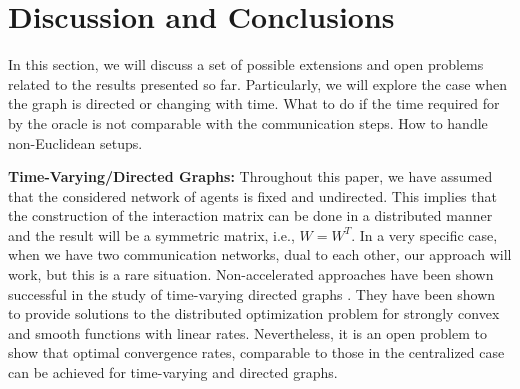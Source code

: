 \documentclass[final]{siamart1116}
\numberwithin{theorem}{section}
\begin{document}
	
	\section{Discussion and Conclusions}\label{sec:discussion}
	
	In this section, we will discuss a set of possible extensions and open problems related to the results presented so far. Particularly, we will explore the case when the graph is directed or changing with time. What to do if the time required for by the oracle is not comparable with the communication steps. How to handle non-Euclidean setups. 
	
	\noindent\textbf{Time-Varying/Directed Graphs:} Throughout this paper, we have assumed that the considered network of agents is fixed and undirected. This implies that the construction of the interaction matrix can be done in a distributed manner and the result will be a symmetric matrix, i.e., $W =W^T$. In a very specific case, when we have two communication networks, dual to each other, our approach will work, but this is a rare situation. Non-accelerated approaches have been shown successful in the study of time-varying directed graphs \cite{ned13,ned16,ned15b,ned16f}. They have been shown to provide solutions to the distributed optimization problem for strongly convex and smooth functions with linear rates. Nevertheless, it is an open problem to show that optimal convergence rates, comparable to those in the centralized case can be achieved for time-varying and directed graphs.
	
\end{document}
